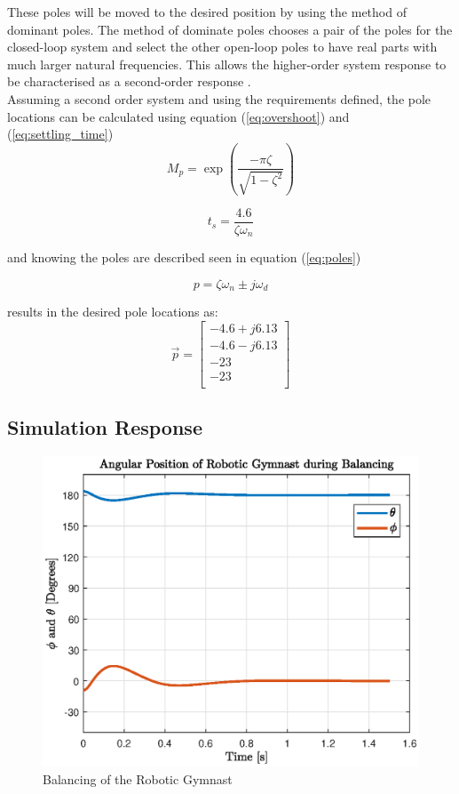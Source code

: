 These poles will be moved to the desired position by using the method of dominant poles. The method of dominate poles chooses a pair of the poles for the closed-loop system and select the other open-loop poles to have real parts with much larger natural frequencies. This allows the higher-order system response to be characterised as a second-order response \citep{textbook}. \\

Assuming a second order system and using the requirements defined, the pole locations can be calculated using equation (\ref{eq:overshoot}) and (\ref{eq:settling_time})
\begin{equation} \label{eq:overshoot}
M_{p} = \exp(\frac{-\pi \zeta}{ \sqrt{1-\zeta^2}})
\end{equation}

\begin{equation} \label{eq:settling_time}
t_{s} = \frac{4.6}{\zeta \omega_{n}}
\end{equation}

and knowing the poles are described seen in equation (\ref{eq:poles}) 

\begin{equation} \label{eq:poles}
p = \zeta \omega_{n} \pm j\omega_{d}
\end{equation}

results in the desired pole locations as:
 $$
 \vec{p} = 
 \begin{bmatrix}
  -4.6 + j6.13 \\
-4.6 - j6.13 \\
-23\\
-23\\
 \end{bmatrix}
 $$


\subsection{Simulation Response}
\begin{figure}[h]
	\centering
	\includegraphics[scale=1]{./figs/balancing}
	\caption{Balancing of the Robotic Gymnast}
	\label{fig:balance}
\end{figure}




